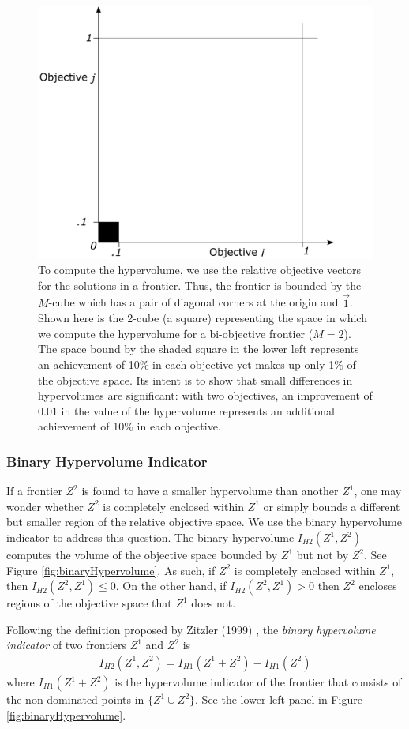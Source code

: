 \begin{figure}
\centering
\includegraphics[width=.5\textwidth]{../images/HypervolumeImprovements}
\caption[Interpreting differences in hypervolumes]{To compute the hypervolume, we use the relative objective vectors for the solutions in a frontier. Thus, the frontier is bounded by the $M$-cube which has a pair of diagonal corners at the origin and $\vec{1}$. Shown here is the 2-cube (a square) representing the space in which we compute the hypervolume for a bi-objective frontier ($M=2$). The space bound by the shaded square in the lower left represents an achievement of 10\% in each objective yet makes up only 1\% of the objective space. Its intent is to show that small differences in hypervolumes are significant: with two objectives, an improvement of 0.01 in the value of the hypervolume represents an additional achievement of 10\% in each objective.}
\label{fig:Hypervol10percent}
\end{figure}

\subsubsection{Binary Hypervolume Indicator}
If a frontier $Z^2$ is found to have a smaller hypervolume than another $Z^1$, one may wonder whether $Z^2$ is completely enclosed within $Z^1$ or simply bounds a different but smaller region of the relative objective space. We use the binary hypervolume indicator to address this question. The binary hypervolume $I_{H2}(Z^1,Z^2)$ computes the volume of the objective space bounded by $Z^1$ but not by $Z^2$. See Figure \ref{fig:binaryHypervolume}. As such, if $Z^2$ is completely enclosed within $Z^1$, then $I_{H2}(Z^2,Z^1) \le 0$. On the other hand, if $I_{H2}(Z^2,Z^1) > 0$ then $Z^2$ encloses regions of the objective space that $Z^1$ does not.

Following the definition proposed by Zitzler (1999) \cite{zitzler1999evolutionary}, the \textit{binary hypervolume indicator} of two frontiers $Z^1$ and $Z^2$ is \cite{zitzler1999evolutionary}
\begin{align}
I_{H2} (Z^1,Z^2) = I_{H1} (Z^1 + Z^2) - I_{H1} (Z^2)
\end{align}
where $I_{H1} (Z^1 + Z^2)$ is the hypervolume indicator of the frontier that consists of the non-dominated points in $\{Z^1 \cup Z^2\}$. See the lower-left panel in Figure \ref{fig:binaryHypervolume}.

